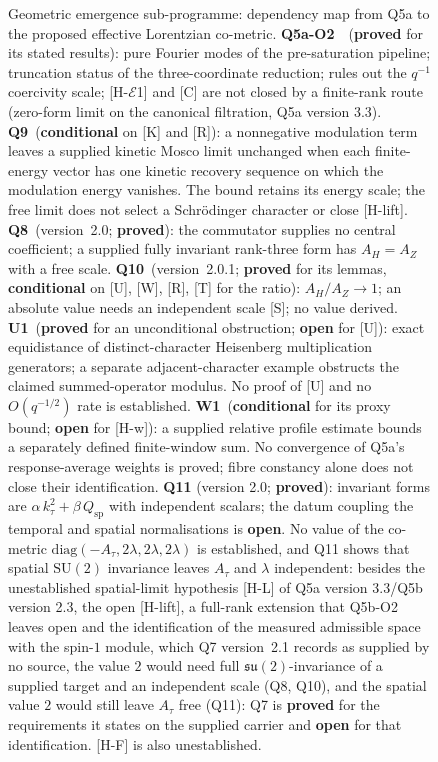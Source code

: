 \documentclass[11pt,a4paper]{article}
\newcommand{\SU}{\mathrm{SU}}
\newcommand{\sproved}{\textcolor{cproved}{\textbf{proved}}}
\newcommand{\sopen}{\textcolor{copen}{\textbf{open}}}
\newcommand{\scond}{\textcolor{ccond}{\textbf{conditional}}}
\begin{document}
\begin{figure}[p]
{\begin{tikzpicture}
        \end{tikzpicture}
      }
      \caption{Geometric emergence sub-programme: dependency map from Q5a to the proposed effective
      Lorentzian co-metric.
      \textbf{Q5a-O2}~\cite{Beau2026q5ao2}~(\sproved{} for its stated results): pure Fourier
      modes of the pre-saturation pipeline; truncation status of the three-coordinate reduction;
      rules out the $q^{-1}$ coercivity scale; [H-$\mathcal{E}$1] and [C] are not closed by a
      finite-rank route (zero-form limit on the canonical filtration, Q5a version 3.3).
      \textbf{Q9}~(\scond{} on [K] and [R]): a nonnegative modulation term leaves a supplied
        kinetic Mosco limit unchanged when each finite-energy vector has one kinetic recovery
        sequence on which the modulation energy vanishes. The bound retains its energy scale;
        the free limit does not select a Schr\"odinger character or close [H-lift].
        \textbf{Q8}~(version~2.0; \sproved{}): the commutator supplies no central coefficient; a supplied
        fully invariant rank-three form has $A_H = A_Z$ with a free scale.
        \textbf{Q10}~(version~2.0.1; \sproved{} for its lemmas, \scond{} on [U], [W], [R], [T] for the ratio):
        $A_H/A_Z \to 1$; an absolute value needs an independent scale [S]; no value derived.
        \textbf{U1}~(\sproved{} for an unconditional obstruction; \sopen{} for [U]):
        exact equidistance of distinct-character Heisenberg multiplication generators;
        a separate adjacent-character example obstructs the claimed summed-operator modulus.
        No proof of [U] and no $O(q^{-1/2})$ rate is established.
        \textbf{W1}~(\scond{} for its proxy bound; \sopen{} for [H-w]): a supplied
        relative profile estimate bounds a separately defined finite-window sum.
        No convergence of Q5a's response-average weights is proved;
        fibre constancy alone does not close their identification.
        \textbf{Q11} (version 2.0; \sproved): invariant forms are $\alpha\,k_\tau^2+\beta\,Q_{\mathrm{sp}}$ with
        independent scalars; the datum coupling the temporal and spatial normalisations is \sopen.
        No value of the co-metric $\mathrm{diag}(-A_\tau,2\lambda,2\lambda,2\lambda)$ is established, and Q11 shows that
        spatial $\SU(2)$ invariance leaves $A_\tau$ and $\lambda$ independent: besides the
        unestablished spatial-limit hypothesis [H-L] of Q5a version 3.3/Q5b version 2.3, the open [H-lift], a
        full-rank extension that Q5b-O2 leaves open and the identification of the measured admissible space with the
        spin-$1$ module, which Q7 version~2.1 records as supplied by no source, the value $2$ would need full
        $\mathfrak{su}(2)$-invariance of a supplied target and an independent scale (Q8, Q10), and the spatial value $2$
        would still leave $A_\tau$ free (Q11): Q7 is
        \sproved{} for the requirements it states on the
        supplied carrier and \sopen{} for that identification.
        [H-F] is also unestablished.}
      \label{fig:geom}
    \end{figure}
    \label{sec:inventory}
\end{document}
